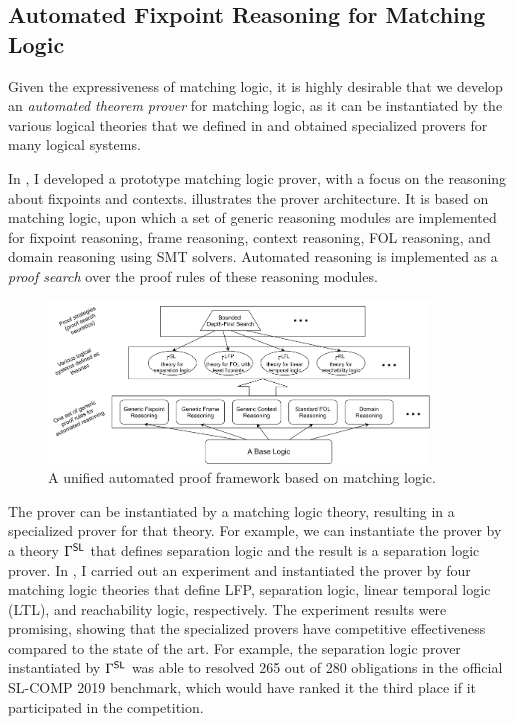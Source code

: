 \documentclass[11pt]{article}
\begin{document}
\subsection{Automated Fixpoint Reasoning for Matching Logic}
\label{sec:mlprover}

Given the expressiveness of matching logic, it is highly desirable that we 
develop an \emph{automated theorem prover} for matching logic, as it can be 
instantiated by the various logical theories that we defined in 
 and obtained specialized provers for  
many logical systems.

In \cite{CTR20}, I developed a prototype matching logic prover,
with a focus on the reasoning about fixpoints and contexts. 
 illustrates the prover architecture.
It is based on matching logic, upon which a set of generic reasoning modules
are implemented for fixpoint reasoning, frame reasoning, context reasoning,
FOL reasoning, and domain reasoning using SMT solvers.
Automated reasoning is implemented as a \emph{proof search} over 
the proof rules of these reasoning modules. 

\begin{figure}
\includegraphics[width=0.9\textwidth]{figs/proofframework.png}
\caption{A unified automated proof framework based on matching 
logic.}
\label{fig:pf}
\end{figure}

The prover can be instantiated by a matching logic theory, resulting in a 
specialized prover for that theory. 
For example, we can instantiate the prover by a theory
$\Gamma^{\mathsf{SL}}$ that defines separation logic \cite{Rey02} and the result is a 
separation logic prover. 
In \cite{CTR20}, I carried out an experiment and instantiated the prover
by four matching logic theories
that define LFP, separation logic, linear temporal logic (LTL), and 
reachability logic, respectively. 
The experiment results were promising, showing that the specialized provers
have competitive effectiveness compared to the state of the art.
For example, the separation logic prover instantiated by $\Gamma^{\mathsf{SL}}$
was able to resolved 265 out of 280 obligations in the official SL-COMP 2019 
benchmark, which would have ranked it the third place if it participated in the 
competition. 
\end{document}
